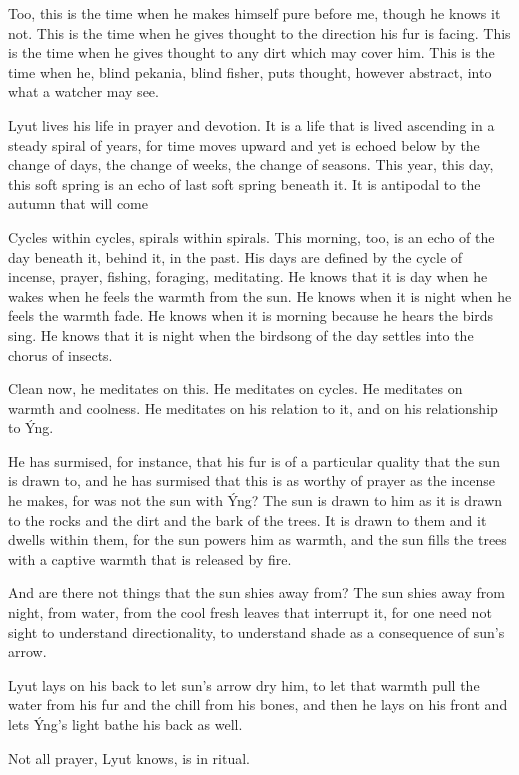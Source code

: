 Too, this is the time when he makes himself pure before me, though he knows it not. This is the time when he gives thought to the direction his fur is facing. This is the time when he gives thought to any dirt which may cover him. This is the time when he, blind pekania, blind fisher, puts thought, however abstract, into what a watcher may see.

Lyut lives his life in prayer and devotion. It is a life that is lived ascending in a steady spiral of years, for time moves upward and yet is echoed below by the change of days, the change of weeks, the change of seasons. This year, this day, this soft spring is an echo of last soft spring beneath it. It is antipodal to the autumn that will come

Cycles within cycles, spirals within spirals. This morning, too, is an echo of the day beneath it, behind it, in the past. His days are defined by the cycle of incense, prayer, fishing, foraging, meditating. He knows that it is day when he wakes when he feels the warmth from the sun. He knows when it is night when he feels the warmth fade. He knows when it is morning because he hears the birds sing. He knows that it is night when the birdsong of the day settles into the chorus of insects.

Clean now, he meditates on this. He meditates on cycles. He meditates on warmth and coolness. He meditates on his relation to it, and on his relationship to Ýng.

He has surmised, for instance, that his fur is of a particular quality that the sun is drawn to, and he has surmised that this is as worthy of prayer as the incense he makes, for was not the sun with Ýng? The sun is drawn to him as it is drawn to the rocks and the dirt and the bark of the trees. It is drawn to them and it dwells within them, for the sun powers him as warmth, and the sun fills the trees with a captive warmth that is released by fire.

And are there not things that the sun shies away from? The sun shies away from night, from water, from the cool fresh leaves that interrupt it, for one need not sight to understand directionality, to understand shade as a consequence of sun's arrow.

Lyut lays on his back to let sun's arrow dry him, to let that warmth pull the water from his fur and the chill from his bones, and then he lays on his front and lets Ýng's light bathe his back as well.

Not all prayer, Lyut knows, is in ritual.

